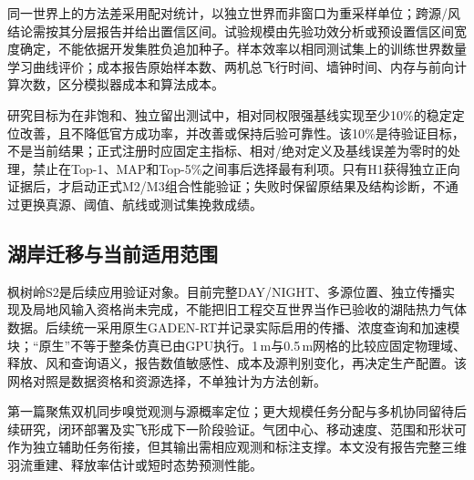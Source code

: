 同一世界上的方法差采用配对统计，以独立世界而非窗口为重采样单位；跨源/风结论需按其分层报告并给出置信区间。试验规模由先验功效分析或预设置信区间宽度确定，不能依据开发集胜负追加种子。样本效率以相同测试集上的训练世界数量学习曲线评价；成本报告原始样本数、两机总飞行时间、墙钟时间、内存与前向计算次数，区分模拟器成本和算法成本。

研究目标为在非饱和、独立留出测试中，相对同权限强基线实现至少10\%的稳定定位改善，且不降低官方成功率，并改善或保持后验可靠性。该10\%是待验证目标，不是当前结果；正式注册时应固定主指标、相对/绝对定义及基线误差为零时的处理，禁止在Top-1、MAP和Top-5\%之间事后选择最有利项。只有H1获得独立正向证据后，才启动正式M2/M3组合性能验证；失败时保留原结果及结构诊断，不通过更换真源、阈值、航线或测试集挽救成绩。

\subsection{湖岸迁移与当前适用范围}
枫树岭S2是后续应用验证对象。目前完整DAY/NIGHT、多源位置、独立传播实现及局地风输入资格尚未完成，不能把旧工程交互世界当作已验收的湖陆热力气体数据。后续统一采用原生GADEN-RT并记录实际启用的传播、浓度查询和加速模块；“原生”不等于整条仿真已由GPU执行。1\,m与0.5\,m网格的比较应固定物理域、释放、风和查询语义，报告数值敏感性、成本及源判别变化，再决定生产配置。该网格对照是数据资格和资源选择，不单独计为方法创新。

第一篇聚焦双机同步嗅觉观测与源概率定位；更大规模任务分配与多机协同留待后续研究，闭环部署及实飞形成下一阶段验证。气团中心、移动速度、范围和形状可作为独立辅助任务衔接，但其输出需相应观测和标注支撑。本文没有报告完整三维羽流重建、释放率估计或短时态势预测性能。
